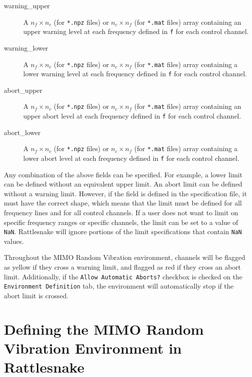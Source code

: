 \documentclass[pdf,12pt,report]{SANDreport}
\newcommand{\inlineCode}{\lstinline[basicstyle=\bfseries\ttfamily]}
\begin{document}
    \begin{description}
        \item[warning\_upper] A $n_f \times n_c$ (for \inlineCode{*.npz} files) or $n_c \times n_f$ (for \inlineCode{*.mat} files) array containing an upper warning level at each frequency defined in \inlineCode{f} for each control channel.
        \item[warning\_lower] A $n_f \times n_c$ (for \inlineCode{*.npz} files) or $n_c \times n_f$ (for \inlineCode{*.mat} files) array containing a lower warning level at each frequency defined in \inlineCode{f} for each control channel.
        \item[abort\_upper] A $n_f \times n_c$ (for \inlineCode{*.npz} files) or $n_c \times n_f$ (for \inlineCode{*.mat} files) array containing an upper abort level at each frequency defined in \inlineCode{f} for each control channel.
        \item[abort\_lower] A $n_f \times n_c$ (for \inlineCode{*.npz} files) or $n_c \times n_f$ (for \inlineCode{*.mat} files) array containing a lower abort level at each frequency defined in \inlineCode{f} for each control channel.
    \end{description}
    
    Any combination of the above fields can be specified.  For example, a lower limit can be defined without an equivalent upper limit.  An abort limit can be defined without a warning limit.  However, if the field is defined in the specification file, it must have the correct shape, which means that the limit must be defined for all frequency lines and for all control channels.  If a user does not want to limit on specific frequency ranges or specific channels, the limit can be set to a value of \inlineCode{NaN}.  Rattlesnake will ignore portions of the limit specifications that contain \inlineCode{NaN} values.
    
    Throughout the \Ac{MIMO} Random Vibration environment, channels will be flagged as yellow if they cross a warning limit, and flagged as red if they cross an abort limit.  Additionally, if the \inlineCode{Allow Automatic Aborts?} checkbox is checked on the \inlineCode{Environment Definition} tab, the environment will automatically stop if the abort limit is crossed.
    
    \section{Defining the \Ac{MIMO} Random Vibration Environment in Rattlesnake}
    
\end{document}
